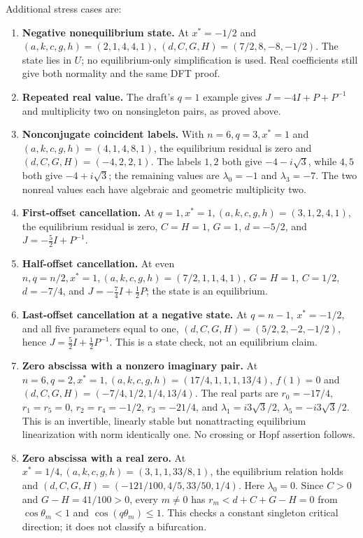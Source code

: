 \documentclass[11pt]{article}
\begin{document}
Additional stress cases are:
\begin{enumerate}[label=(\arabic*)]
\item \textbf{Negative nonequilibrium state.}
At $x^*=-1/2$ and $(a,k,c,g,h)=(2,1,4,4,1)$,
$(d,C,G,H)=(7/2,8,-8,-1/2)$. The state lies in $U$; no equilibrium-only
simplification is used. Real coefficients still give both normality and
the same DFT proof.
\item \textbf{Repeated real value.} The draft's $q=1$ example gives
$J=-4I+P+P^{-1}$ and multiplicity two on nonsingleton pairs, as proved above.
\item \textbf{Nonconjugate coincident labels.}
With $n=6,q=3,x^*=1$ and $(a,k,c,g,h)=(4,1,4,8,1)$,
the equilibrium residual is zero and $(d,C,G,H)=(-4,2,2,1)$.
The labels $1,2$ both give $-4-i\sqrt3$, while $4,5$ both give
$-4+i\sqrt3$; the remaining values are $\lambda_0=-1$ and $\lambda_3=-7$.
The two nonreal values each have algebraic and geometric multiplicity two.
\item \textbf{First-offset cancellation.}
At $q=1,x^*=1,(a,k,c,g,h)=(3,1,2,4,1)$, the equilibrium residual is zero,
$C=H=1$, $G=1$, $d=-5/2$, and $J=-\tfrac52I+P^{-1}$.
\item \textbf{Half-offset cancellation.}
At even $n,q=n/2,x^*=1,(a,k,c,g,h)=(7/2,1,1,4,1)$,
$G=H=1$, $C=1/2$, $d=-7/4$, and $J=-\tfrac74I+\tfrac12P$;
the state is an equilibrium.
\item \textbf{Last-offset cancellation at a negative state.}
At $q=n-1$, $x^*=-1/2$, and all five parameters equal to one,
$(d,C,G,H)=(5/2,2,-2,-1/2)$, hence
$J=\tfrac52I+\tfrac12P^{-1}$. This is a state check, not an equilibrium claim.
\item \textbf{Zero abscissa with a nonzero imaginary pair.}
At $n=6,q=2,x^*=1,(a,k,c,g,h)=(17/4,1,1,1,13/4)$,
$f(1)=0$ and $(d,C,G,H)=(-7/4,1/2,1/4,13/4)$.
The real parts are $r_0=-17/4$, $r_1=r_5=0$,
$r_2=r_4=-1/2$, $r_3=-21/4$, and
$\lambda_1=i3\sqrt3/2$, $\lambda_5=-i3\sqrt3/2$.
This is an invertible, linearly stable but nonattracting equilibrium
linearization with norm identically one. No crossing or Hopf assertion follows.
\item \textbf{Zero abscissa with a real zero.}
At $x^*=1/4,(a,k,c,g,h)=(3,1,1,33/8,1)$, the equilibrium relation holds and
$(d,C,G,H)=(-121/100,4/5,33/50,1/4)$.
Here $\lambda_0=0$. Since $C>0$ and $G-H=41/100>0$,
every $m\ne0$ has $r_m<d+C+G-H=0$ from $\cos\theta_m<1$ and
$\cos(q\theta_m)\le1$. This checks a constant singleton critical direction;
it does not classify a bifurcation.
\end{enumerate}
\end{document}
